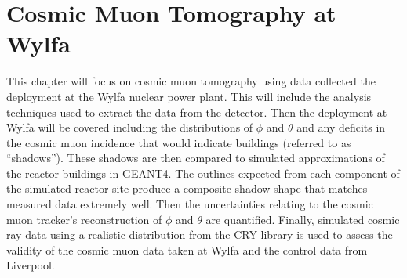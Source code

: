 
\chapter{Cosmic Muon Tomography at Wylfa}\label{chp:cosmicMuonTomography}

\ifpdf
    \graphicspath{{Chapter5/Figs/Raster/}{Chapter5/Figs/PDF/}{Chapter5/Figs/}}
\else
    \graphicspath{{Chapter5/Figs/Vector/}{Chapter5/Figs/}}
\fi

This chapter will focus on cosmic muon tomography using data collected the deployment at the Wylfa nuclear power plant. This will include the analysis techniques used to extract the data from the detector. Then the deployment at Wylfa will be covered including the distributions of $\phi$ and $\theta$ and any deficits in the cosmic muon incidence that would indicate buildings (referred to as ``shadows''). These shadows are then compared to simulated approximations of the reactor buildings in GEANT4. The outlines expected from each component of the simulated reactor site produce a composite shadow shape that matches measured data extremely well. Then the uncertainties relating to the cosmic muon tracker's reconstruction of $\phi$ and $\theta$ are quantified. Finally, simulated cosmic ray data using a realistic distribution from the CRY library is used to assess the validity of the cosmic muon data taken at Wylfa and the control data from Liverpool. 

